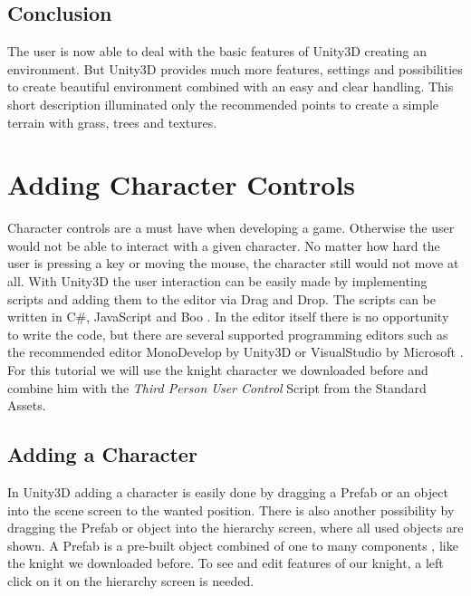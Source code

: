 \documentclass[12pt, a4paper, titlepage]{article}
\newcommand{\csh}{C{\#}}
\begin{document}
\subsection{Conclusion}
The user is now able to deal with the basic features of Unity3D creating an environment. But Unity3D provides much more features, settings and possibilities to create beautiful environment combined with an easy and clear handling. This short description illuminated only the recommended points to create a simple terrain with grass, trees and textures.


\section{Adding Character Controls}

Character controls are a must have when developing a game. Otherwise the user would not be able to interact with a given character. No matter how hard the user is pressing a key or moving the mouse, the character still would not move at all.
With Unity3D the user interaction can be easily made by implementing scripts and adding them to the editor via Drag and Drop. The scripts can be written in \csh, JavaScript and Boo \cite{b1}. In the editor itself there is no opportunity to write the code, but there are several supported programming editors such as the recommended editor MonoDevelop by Unity3D or VisualStudio by Microsoft \cite{b1}. \\
For this tutorial we will use the knight character we downloaded before and combine him with the \emph{Third Person User Control} Script from the Standard Assets.

\subsection{Adding a Character}

In Unity3D adding a character is easily done by dragging a Prefab or an object into the scene screen to the wanted position. There is also another possibility by dragging the Prefab or object into the hierarchy screen, where all used objects are shown. A Prefab is a pre-built object combined of one to many components \cite{b2}, like the knight we downloaded before.
To see and edit features of our knight, a left click on it on the hierarchy screen is needed. 
\end{document}
